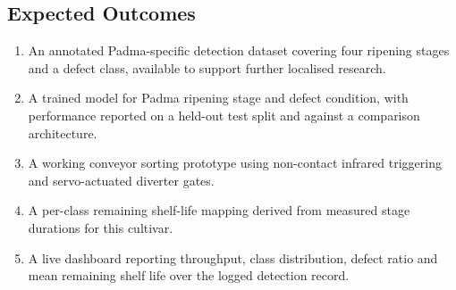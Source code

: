 \subsection{Expected Outcomes}
\label{sec:outcomes}

\begin{enumerate}
    \item An annotated Padma-specific detection dataset covering four ripening stages and a defect class, available to support further localised research.
    \item A trained model for Padma ripening stage and defect condition, with performance reported on a held-out test split and against a comparison architecture.
    \item A working conveyor sorting prototype using non-contact infrared triggering and servo-actuated diverter gates.
    \item A per-class remaining shelf-life mapping derived from measured stage durations for this cultivar.
    \item A live dashboard reporting throughput, class distribution, defect ratio and mean remaining shelf life over the logged detection record.
\end{enumerate}

\clearpage
